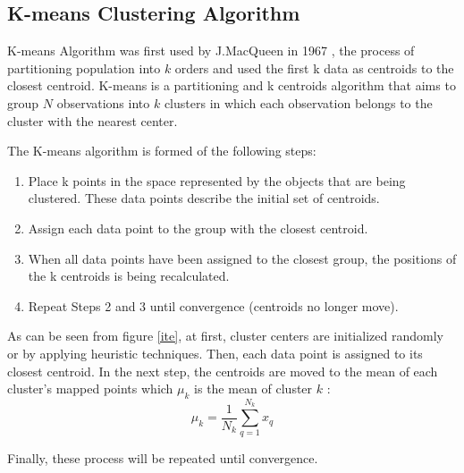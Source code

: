 \documentclass[../UNBThesis2.tex]{subfiles}
\begin{document}







\subsection{K-means Clustering Algorithm} \label{kmeansalgo}
K-means Algorithm was first used by J.MacQueen in 1967 \cite{macqueen}, the process of partitioning population into $k$ orders and used the first k data as centroids to the closest centroid.
K-means is a partitioning and k centroids algorithm that aims to group $N$ observations into $k$ clusters in which each observation belongs to the cluster with the nearest center.

The K-means algorithm is formed of the following steps:
\begin{enumerate}
    \item Place k points in the space represented by the objects that are being clustered. These data points describe the initial set of centroids.
    \item Assign each data point to the group with the closest centroid.
    \item When all data points have been assigned to the closest group, the positions of the k centroids is being recalculated.
    \item Repeat Steps 2 and 3 until convergence (centroids no longer move).
\end{enumerate}




As can be seen from figure \ref{ite}, at first, cluster centers are initialized randomly or by applying heuristic techniques. Then, each data point is assigned to its closest centroid. 
In the next step,  the centroids are moved to the mean of each cluster's mapped points which ${\mu_k}$ is the mean of cluster $k$ :
\begin{equation}
    {\mu_k} = \frac{1}{{N_k}}\sum_{q=1}^{{N_k}} {x_q}
\end{equation}

Finally, these process will be repeated until convergence. 
\end{document}
